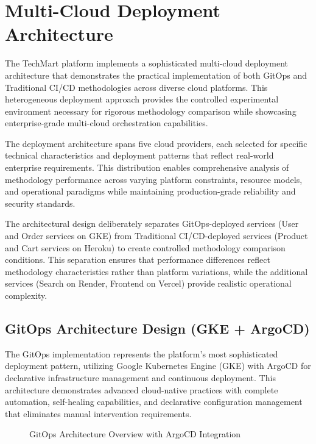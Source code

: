 \section{Multi-Cloud Deployment Architecture}

The TechMart platform implements a sophisticated multi-cloud deployment architecture that demonstrates the practical implementation of both GitOps and Traditional CI/CD methodologies across diverse cloud platforms. This heterogeneous deployment approach provides the controlled experimental environment necessary for rigorous methodology comparison while showcasing enterprise-grade multi-cloud orchestration capabilities.

The deployment architecture spans five cloud providers, each selected for specific technical characteristics and deployment patterns that reflect real-world enterprise requirements. This distribution enables comprehensive analysis of methodology performance across varying platform constraints, resource models, and operational paradigms while maintaining production-grade reliability and security standards.

The architectural design deliberately separates GitOps-deployed services (User and Order services on GKE) from Traditional CI/CD-deployed services (Product and Cart services on Heroku) to create controlled methodology comparison conditions. This separation ensures that performance differences reflect methodology characteristics rather than platform variations, while the additional services (Search on Render, Frontend on Vercel) provide realistic operational complexity.

\subsection{GitOps Architecture Design (GKE + ArgoCD)}

The GitOps implementation represents the platform's most sophisticated deployment pattern, utilizing Google Kubernetes Engine (GKE) with ArgoCD for declarative infrastructure management and continuous deployment. This architecture demonstrates advanced cloud-native practices with complete automation, self-healing capabilities, and declarative configuration management that eliminates manual intervention requirements.

\begin{figure}[H]
\centering
\caption{GitOps Architecture Overview with ArgoCD Integration}
\label{fig:gitops-architecture-overview}
\end{figure}

